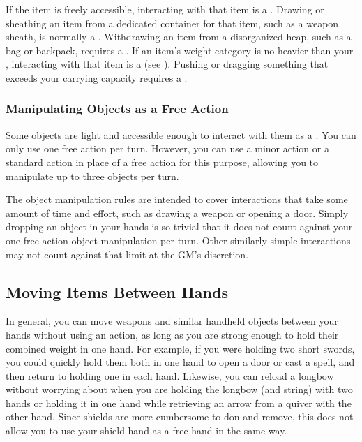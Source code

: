     \begin{raggeditemize}
       If the item is freely accessible, interacting with that item is a .
        Drawing or sheathing an item from a dedicated container for that item, such as a weapon sheath, is normally a .
        Withdrawing an item from a disorganized heap, such as a bag or backpack, requires a .
       If an item's weight category is no heavier than your , interacting with that item is a  (see ).
        Pushing or dragging something that exceeds your carrying capacity requires a .
    \end{raggeditemize}

    \subsubsection{Manipulating Objects as a Free Action}
      Some objects are light and accessible enough to interact with them as a .
      You can only use one free action  per turn.
      However, you can use a minor action or a standard action in place of a free action for this purpose, allowing you to manipulate up to three objects per turn.

      The object manipulation rules are intended to cover interactions that take some amount of time and effort, such as drawing a weapon or opening a door.
      Simply dropping an object in your hands is so trivial that it does not count against your one free action object manipulation per turn.
      Other similarly simple interactions may not count against that limit at the GM's discretion.

  \subsection{Moving Items Between Hands}\label{Moving Items Between Hands}
    In general, you can move weapons and similar handheld objects between your hands without using an action, as long as you are strong enough to hold their combined weight in one hand.
    For example, if you were holding two short swords, you could quickly hold them both in one hand to open a door or cast a spell, and then return to holding one in each hand.
    Likewise, you can reload a longbow without worrying about when you are holding the longbow (and string) with two hands or holding it in one hand while retrieving an arrow from a quiver with the other hand.
    Since shields are more cumbersome to don and remove, this does not allow you to use your shield hand as a free hand in the same way.

